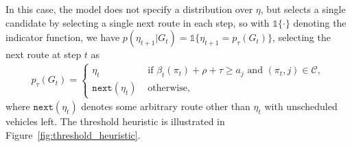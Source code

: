 \documentclass[a4paper]{report}
\theoremstyle{definition}
\theoremstyle{plain}
\begin{document}
In this case, the model does not specify a distribution over $\eta$, but selects
a single candidate by selecting a single next route in each step, so with
$\mathds{1}\{ \cdot \}$ denoting the indicator function, we have
$p(\eta_{t+1} | G_{t}) = \mathds{1}\{ \eta_{t+1} = p_{\tau}(G_{t}) \}$,
selecting the next route at step $t$ as
\begin{align*}
  p_{\tau}(G_{t}) = \begin{cases}
                \eta_{t} \quad &\text{ if } \beta_{t}(\pi_{t}) + \rho + \tau \geq a_{j} \text{ and } (\pi_{t},j) \in \mathcal{C} , \\
                \texttt{next}(\eta_{t}) & \text{ otherwise, }
              \end{cases}
\end{align*}
where $\texttt{next}(\eta_{t})$ denotes some arbitrary route other than $\eta_{t}$ with
unscheduled vehicles left.
%
The threshold heuristic is illustrated in Figure~\ref{fig:threshold_heuristic}.
\end{document}
